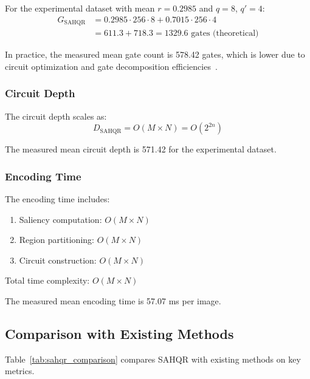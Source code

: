 \documentclass{ipol}
\begin{document}
For the experimental dataset with mean $r = 0.2985$ and $q = 8$, $q' = 4$:
\begin{align}
G_{\text{SAHQR}} &= 0.2985 \cdot 256 \cdot 8 + 0.7015 \cdot 256 \cdot 4 \\
&= 611.3 + 718.3 = 1329.6 \text{ gates (theoretical)}
\end{align}

In practice, the measured mean gate count is 578.42 gates, which is lower due to circuit optimization and gate decomposition efficiencies~\cite{bib68,bib69}.

\subsubsection{Circuit Depth}

The circuit depth scales as:
\begin{equation}
D_{\text{SAHQR}} = O(M \times N) = O(2^{2n})
\label{eq:sahqr_depth}
\end{equation}

The measured mean circuit depth is 571.42 for the experimental dataset.

\subsubsection{Encoding Time}

The encoding time includes:
\begin{enumerate}
\item Saliency computation: $O(M \times N)$
\item Region partitioning: $O(M \times N)$
\item Circuit construction: $O(M \times N)$
\end{enumerate}

Total time complexity: $O(M \times N)$

The measured mean encoding time is 57.07 ms per image.

\subsection{Comparison with Existing Methods}

Table~\ref{tab:sahqr_comparison} compares SAHQR with existing methods on key metrics.
\end{document}
